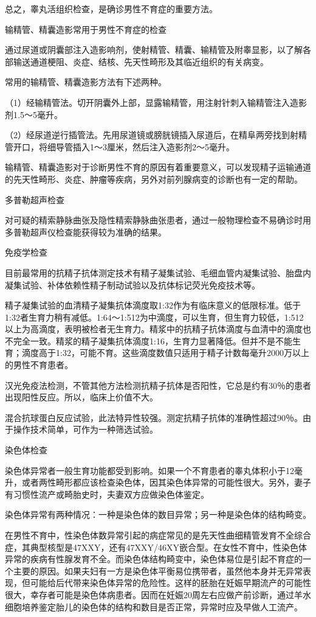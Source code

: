 \documentclass[12pt,UTF8,openany]{ctexbook}
\begin{document}
总之，睾丸活组织检查，是确诊男性不育症的重要方法。

输精管、精囊造影常用于男性不育症的检查

通过尿道或阴囊部注入造影响剂，使射精管、精囊、输精管及附睾显影，以了解各部输送通道梗阻、炎症、结核、先天性畸形及其临近组织的有关病变。

常用的输精管、精囊造影方法有下述两种。

（1）经输精管法。切开阴囊外上部，显露输精管，用注射针刺入输精管注入造影剂1.5～5毫升。

（2）经尿道逆行插管法。先用尿道镜或膀胱镜插入尿道后，在精阜两旁找到射精管开口，将细导管插入1～3厘米，然后注入造影剂2～5毫升。

输精管、精囊造影对于诊断男性不育的原因有着重要意义，可以发现精子运输通道的先天性畸形、炎症、肿瘤等疾病，另外对前列腺病变的诊断也有一定的帮助。

多普勒超声检查

对可疑的精索静脉曲张及隐性精索静脉曲张患者，通过一般物理检查不易确诊时用多普勒超声仪检查能获得较为准确的结果。

免疫学检查

目前最常用的抗精子抗体测定技术有精子凝集试验、毛细血管内凝集试验、胎盘内凝集试验、补体依赖性精子制动试验以及抗体标记荧光免疫技术等。

精子凝集试验的血清精子凝集抗体滴度取1:32作为有临床意义的低限标准。低于1:32者生育力稍有减低。1:64～1:512为中滴度，可以生育，但生育力较低，1:512以上为高滴度，表明被检者无生育力。精浆中的抗精子抗体滴度与血清中的滴度也不完全一致。精浆的精子凝集抗体滴度1:16，生育力显著降低。但并不是不能生育；滴度高于1:32，可能不育。这些滴度数值只适用于精子计数每毫升2000万以上的男性不育患者。

汉光免疫法检测，不管其他方法检测抗精子抗体是否阳性，它总是约有30％的患者出现阳性反应。所以，临床上价值不大。

混合抗球蛋白反应试验，此法特异性较强。测定抗精子抗体的准确性超过90％。由于操作技术简单，可作为一种筛选试验。

染色体检查

染色体异常者一般生育功能都受到影响。如果一个不育患者的睾丸体积小于12毫升，或者两性畸形都应该检查染色体，因其染色体异常的可能性很大。另外，妻子有习惯性流产或畸胎史时，夫妻双方应做染色体鉴定。

染色体异常有两种情况：一种是染色体的数目异常；另一种是染色体的结构畸变。

在男性不育中，性染色体数异常引起的病症常见的是先天性曲细精管发育不全综合症，其典型核型是47XXY，还有47XXY/46XY嵌合型。在女性不育中，性染色体异常的疾病有性腺发育不全。而染色体结构畸变中，染色体易位是引起不育症的一个主要的原因。如果夫妇有一方是染色体平衡易位携带者，虽然他本身并无异常表现，但可能给后代带来染色体异常的危险性。这样的胚胎在妊娠早期流产的可能性很大，幸存者可能是染色体病患者。因而在妊娠20周左右应做产前诊断，通过羊水细胞培养鉴定胎儿的染色体的结构和数目是否正常，异常时应及早做人工流产。
\end{document}

